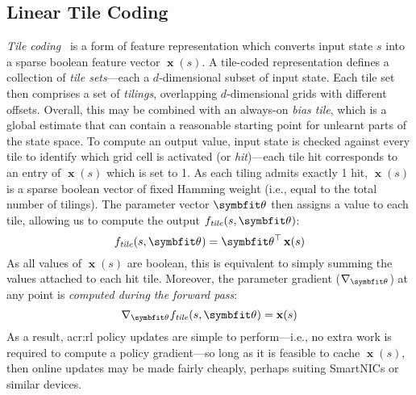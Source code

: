 \subsection{Linear Tile Coding}\label{sec:tile-code}
\emph{Tile coding}~\parencite[pp.~\numrange{217}{221}]{RL2E} is a form of feature representation which converts input state $s$ into a sparse boolean feature vector $\operatorname{\mathbf{x}}(s)$.
A tile-coded representation defines a collection of \emph{tile sets}---each a $d$-dimensional subset of input state.
Each tile set then comprises a set of \emph{tilings}, overlapping $d$-dimensional grids with different offsets.
Overall, this may be combined with an always-on \emph{bias tile}, which is a global estimate that can contain a reasonable starting point for unlearnt parts of the state space.
To compute an output value, input state is checked against every tile to identify which grid cell is activated (or \emph{hit})---each tile hit corresponds to an entry of $\operatorname{\mathbf{x}}(s)$ which is set to 1.
As each tiling admits exactly 1 hit, $\operatorname{\mathbf{x}}(s)$ is a sparse boolean vector of fixed Hamming weight (i.e., equal to the total number of tilings).
The parameter vector $\wvec{}$ then assigns a value to each tile, allowing us to compute the output $f_\mathit{tile}(s, \wvec{})$:
\begin{equation}
	f_\mathit{tile}(s, \wvec{}) = \wvec{}^{\top} \operatorname{\mathbf{x}}(s)
	\label{eqn:lin-approx}
\end{equation}
As all values of $\operatorname{\mathbf{x}}(s)$ are boolean, this is equivalent to simply summing the values attached to each hit tile.
Moreover, the parameter gradient ($\nabla_{\wvec{}}$) at any point is \emph{computed during the forward pass}:
\begin{equation}
	\nabla_{\wvec{}}{f_\mathit{tile}(s, \wvec{})} = \operatorname{\mathbf{x}}(s)
\end{equation}
As a result, \gls{acr:rl} policy updates are simple to perform---i.e., no extra work is required to compute a policy gradient---so long as it is feasible to cache $\operatorname{\mathbf{x}}(s)$, then online updates may be made fairly cheaply, perhaps suiting SmartNICs or similar devices.

